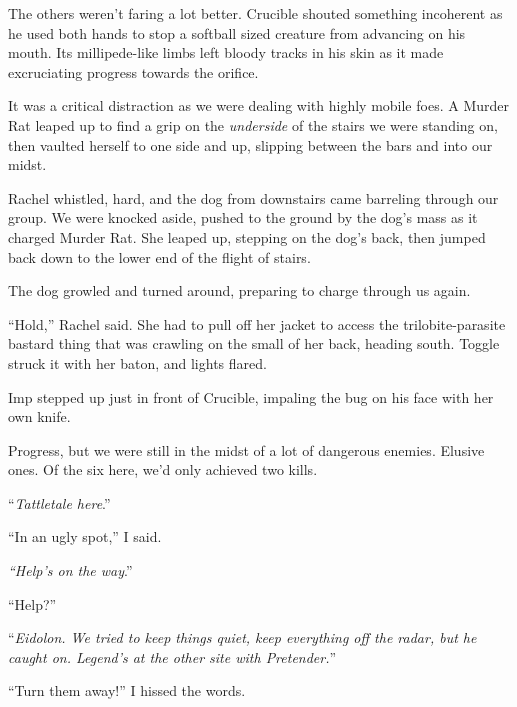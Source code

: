 The others weren't faring a lot better.  Crucible shouted something incoherent as he used both hands to stop a softball sized creature from advancing on his mouth.  Its millipede-like limbs left bloody tracks in his skin as it made excruciating progress towards the orifice.



It was a critical distraction as we were dealing with highly mobile foes.  A Murder Rat leaped up to find a grip on the \emph{underside }of the stairs we were standing on, then vaulted herself to one side and up, slipping between the bars and into our midst.



Rachel whistled, hard, and the dog from downstairs came barreling through our group.  We were knocked aside, pushed to the ground by the dog's mass as it charged Murder Rat.  She leaped up, stepping on the dog's back, then jumped back down to the lower end of the flight of stairs.



The dog growled and turned around, preparing to charge through us again.



``Hold,'' Rachel said.  She had to pull off her jacket to access the trilobite-parasite bastard thing that was crawling on the small of her back, heading south.  Toggle struck it with her baton, and lights flared.



Imp stepped up just in front of Crucible, impaling the bug on his face with her own knife.



Progress, but we were still in the midst of a lot of dangerous enemies.  Elusive ones.  Of the six here, we'd only achieved two kills.



``\emph{Tattletale here}.''



``In an ugly spot,'' I said.



\emph{``Help's on the way}.''



``Help?''



``\emph{Eidolon.  We tried to keep things quiet, keep everything off the radar, but he caught on.  Legend's at the other site with Pretender.}''



``Turn them away!'' I hissed the words.



